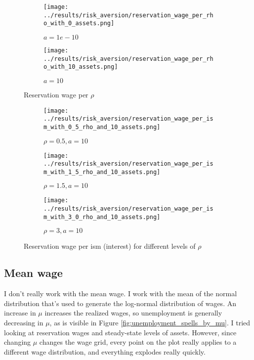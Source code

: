 \documentclass[12pt]{article}
\begin{document}
\begin{figure}[hbt!]

\begin{subfigure}{0.5\textwidth}
\texttt{[image: ../results/risk\_aversion/reservation\_wage\_per\_rho\_with\_0\_assets.png]} \caption{$a=1e-10$}
\end{subfigure}%
\begin{subfigure}{0.5\textwidth}
\texttt{[image: ../results/risk\_aversion/reservation\_wage\_per\_rho\_with\_10\_assets.png]}
\caption{$a=10$}
\end{subfigure}

\caption{Reservation wage per $\rho$}
\label{fig:reservation_wage_per_rho}
\end{figure}


\begin{figure}[hbt!]

\begin{subfigure}{0.33\textwidth}
\texttt{[image: ../results/risk\_aversion/reservation\_wage\_per\_ism\_with\_0\_5\_rho\_and\_10\_assets.png]} \caption{$\rho=0.5, a=10$}
\end{subfigure}%
\begin{subfigure}{0.33\textwidth}
\texttt{[image: ../results/risk\_aversion/reservation\_wage\_per\_ism\_with\_1\_5\_rho\_and\_10\_assets.png]}
\caption{$\rho=1.5, a=10$}
\end{subfigure}%
\begin{subfigure}{0.33\textwidth}
\texttt{[image: ../results/risk\_aversion/reservation\_wage\_per\_ism\_with\_3\_0\_rho\_and\_10\_assets.png]}
\caption{$\rho=3, a=10$}
\end{subfigure}

\caption{Reservation wage per ism (interest) for different levels of $\rho$}
\label{fig:reservation_wage_per_ism_and_rho}
\end{figure}



\clearpage

\subsection{Mean wage}

I don't really work with the mean wage. I work with the mean of the normal distribution that's used to generate the log-normal distribution of wages. An increase in $\mu$ increases the realized wages, so unemployment is generally decreasing in $\mu$, as is visible in Figure \ref{fig:unemployment_spells_by_mu}. I tried looking at reservation wages and steady-state levels of assets. However, since changing $\mu$ changes the wage grid, every point on the plot really applies to a different wage distribution, and everything explodes really quickly.
\end{document}
